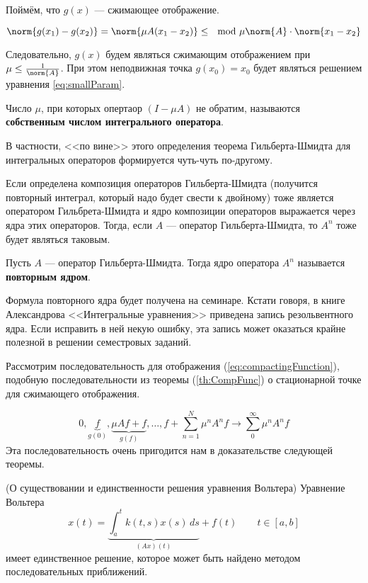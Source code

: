 	Поймём, что $g(x)$ --- сжимающее отображение.
	
	$$\norm{g(x_1) - g(x_2)} = \norm{\mu A(x_1 - x_2)} \leq \mod{\mu} \norm{A} \cdot \norm{x_1 - x_2}$$
	
	Следовательно, $g(x)$ будем являться сжимающим отображением при $\mu \leq \frac{1}{\norm{A}}$. При этом
	неподвижная точка $g(x_0) = x_0$ будет являться решением уравнения \ref{eq:smallParam}.
	
	\begin{defi}
		Число $\mu$, при которых опертаор $(I - \mu A)$ не обратим, называются \textbf{собственным числом
		интегрального оператора}.
	\end{defi}
	
	В частности, <<по вине>> этого определения теорема Гильберта-Шмидта для интегральных операторов формируется
	чуть-чуть по-другому.
	
	Если определена композиция операторов Гильберта-Шмидта (получится повторный интеграл, который надо будет 
	свести к двойному) тоже является оператором Гильбрета-Шмидта и ядро композиции операторов выражается 
	через ядра этих операторов. Тогда, если $A$ --- оператор Гильберта-Шмидта, то $A^n$ тоже будет являться
	таковым.
	
	\begin{defi}
		Пусть $A$ --- оператор Гильберта-Шмидта. Тогда ядро оператора $A^n$ называется \textbf{повторным ядром}.
	\end{defi}
	
	{\footnotesize
	Формула повторного ядра будет получена на семинаре. Кстати говоря, в книге Александрова <<Интегральные уравнения>>
	приведена запись резольвентного ядра. Если исправить в ней некую ошибку, эта запись может оказаться крайне полезной
	в решении семестровых заданий.\par
	}
	
	Рассмотрим последовательность для отображения (\ref{eq:compactingFunction}), подобную последовательности
	из теоремы (\ref{th:CompFunc}) о стационарной точке для сжимающего отображения.
	
	$$0, \underbrace{f}_{g(0)}, \underbrace{\mu Af + f}_{g(f)}, \ldots, f + \sum_{n=1}^N \mu^nA^nf \rightarrow \sum_0^{\infty} \mu^nA^n f$$
	Эта последовательность очень пригодится нам в доказательстве следующей теоремы.	
	
	\begin{theorem}
		(О существовании и единственности решения уравнения Вольтера)
		Уравнение Вольтера
		$$x(t) = \underbrace{\int_a^t k(t,s) x(s) \, ds}_{(Ax)(t)} + f(t) \qquad t\in [a,b]$$
		имеет единственное решение, которое может быть найдено методом последовательных приближений.
	\end{theorem}		
	
